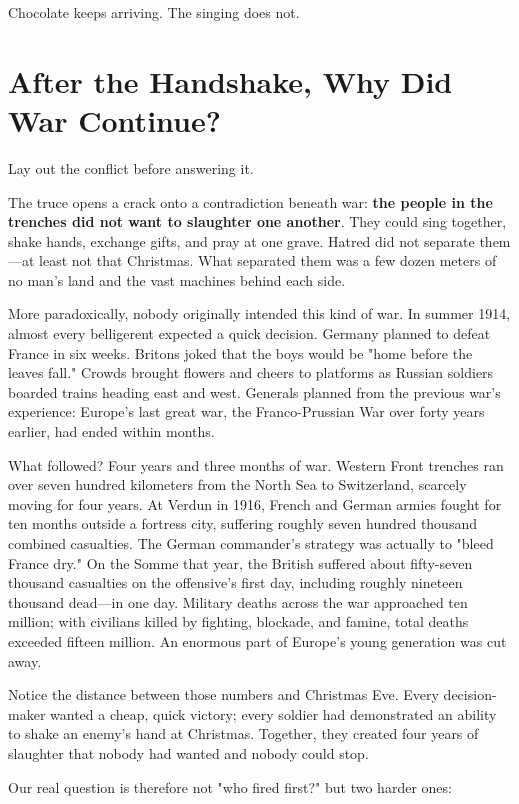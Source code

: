 Chocolate keeps arriving. The singing does not.

\section{After the Handshake, Why Did War Continue?}
Lay out the conflict before answering it.

The truce opens a crack onto a contradiction beneath war: \textbf{the people in the trenches did not want to slaughter one another}. They could sing together, shake hands, exchange gifts, and pray at one grave. Hatred did not separate them---at least not that Christmas. What separated them was a few dozen meters of no man's land and the vast machines behind each side.

More paradoxically, nobody originally intended this kind of war. In summer 1914, almost every belligerent expected a quick decision. Germany planned to defeat France in six weeks. Britons joked that the boys would be "home before the leaves fall." Crowds brought flowers and cheers to platforms as Russian soldiers boarded trains heading east and west. Generals planned from the previous war's experience: Europe's last great war, the Franco-Prussian War over forty years earlier, had ended within months.

What followed? Four years and three months of war. Western Front trenches ran over seven hundred kilometers from the North Sea to Switzerland, scarcely moving for four years. At Verdun in 1916, French and German armies fought for ten months outside a fortress city, suffering roughly seven hundred thousand combined casualties. The German commander's strategy was actually to "bleed France dry." On the Somme that year, the British suffered about fifty-seven thousand casualties on the offensive's first day, including roughly nineteen thousand dead---in one day. Military deaths across the war approached ten million; with civilians killed by fighting, blockade, and famine, total deaths exceeded fifteen million. An enormous part of Europe's young generation was cut away.

Notice the distance between those numbers and Christmas Eve. Every decision-maker wanted a cheap, quick victory; every soldier had demonstrated an ability to shake an enemy's hand at Christmas. Together, they created four years of slaughter that nobody had wanted and nobody could stop.

Our real question is therefore not "who fired first?" but two harder ones:

